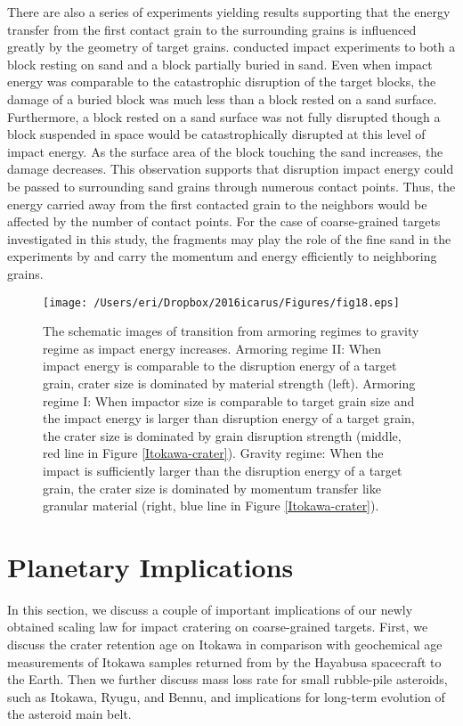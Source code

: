 \documentclass[3p,authoryear]{elsarticle}
\newcommand{\II}{I\hspace{-.1 em}I}
\begin{document}
There are also a series of experiments yielding results supporting that the energy transfer from the first contact grain to the surrounding grains is influenced greatly by the geometry of target grains.
\citet{durda2011} conducted impact experiments to both a block resting on sand and a block partially buried in sand.
Even when impact energy was comparable to the catastrophic disruption of the target blocks, the damage of a buried block was much less than a block rested on a sand surface.
Furthermore, a block rested on a sand surface was not fully disrupted though a block suspended in space would be catastrophically disrupted at this level of impact energy.
As the surface area of the block touching the sand increases, the damage decreases.
This observation supports that disruption impact energy could be passed to surrounding sand grains through numerous contact points.
Thus, the energy carried away from the first contacted grain to the neighbors would be affected by the number of contact points.
For the case of coarse-grained targets investigated in this study, the fragments may play the role of the fine sand in the experiments by \citet{durda2011} and carry the momentum and energy efficiently to neighboring grains.

\begin{figure}[htbp]
	\centering
	\texttt{[image: /Users/eri/Dropbox/2016icarus/Figures/fig18.eps]}
	\caption{The schematic images of transition from armoring regimes to gravity regime as impact energy increases. Armoring regime \II: When impact energy is comparable to the disruption energy of a target grain, crater size is dominated by material strength (left). Armoring regime I: When impactor size is comparable to target grain size and the impact energy is larger than disruption energy of a target grain, the crater size is dominated by grain disruption strength (middle, red line in Figure \ref{Itokawa-crater}). Gravity regime: When the impact is sufficiently larger than the disruption energy of a target grain, the crater size is dominated by momentum transfer like granular material (right, blue line in Figure \ref{Itokawa-crater}).}
	\label{schema-energy}
	\centering
\end{figure}

\section{Planetary Implications}\label{sec:implication}
In this section, we discuss a couple of important implications of our newly obtained scaling law for impact cratering on coarse-grained targets.
First, we discuss the crater retention age on Itokawa in comparison with geochemical age measurements of Itokawa samples returned from by the Hayabusa spacecraft to the Earth.
Then we further discuss mass loss rate for small rubble-pile asteroids, such as Itokawa, Ryugu, and Bennu, and implications for long-term evolution of the asteroid main belt.
\end{document}

